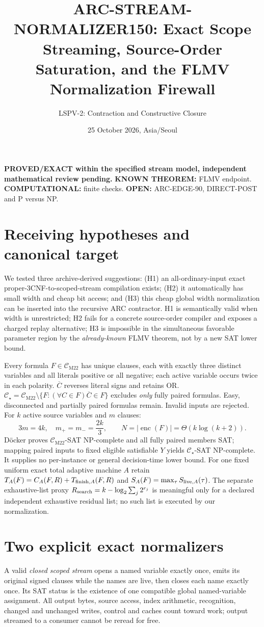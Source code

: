 \documentclass[11pt]{article}
\title{ARC-STREAM-NORMALIZER150: Exact Scope Streaming, Source-Order Saturation, and the FLMV Normalization Firewall}
\author{LSPV-2: Contraction and Constructive Closure}
\date{25 October 2026, Asia/Seoul}
\newcommand{\CM}{\mathcal C_{\mathrm{M22}}}
\newcommand{\CS}{\mathcal C_\star}
\begin{document}
\maketitle
\noindent\textbf{PROVED/EXACT within the specified stream model, independent mathematical review pending.}
\textbf{KNOWN THEOREM:} FLMV endpoint. \textbf{COMPUTATIONAL:} finite checks. \textbf{OPEN:} ARC-EDGE-90, DIRECT-POST and P versus NP.

\section{Receiving hypotheses and canonical target}
We tested three archive-derived suggestions: (H1) an all-ordinary-input exact proper-3CNF-to-scoped-stream compilation exists; (H2) it automatically has small width and cheap bit access; and (H3) this cheap global width normalization can be inserted into the recursive ARC contractor. H1 is semantically valid when width is unrestricted; H2 fails for a concrete source-order compiler and exposes a charged replay alternative; H3 is impossible in the simultaneous favorable parameter region by the \emph{already-known} FLMV theorem, not by a new SAT lower bound.

Every formula $F\in\CM$ has unique clauses, each with exactly three distinct variables and all literals positive or all negative; each active variable occurs twice in each polarity. $\overline C$ reverses literal signs and retains OR. $\CS=\CM\setminus\{F:(\forall C\in F)\overline C\in F\}$ excludes \emph{only} fully paired formulas. Easy, disconnected and partially paired formulas remain. Invalid inputs are rejected. For $k$ active source variables and $m$ clauses:
\[
3m=4k,\quad m_+=m_-=\frac{2k}{3},\qquad N=|\operatorname{enc}(F)|=\Theta(k\log(k+2)).
\]
D\"ocker \cite{docker} proves $\CM$-SAT NP-complete and all fully paired members SAT; mapping paired inputs to fixed eligible satisfiable $Y$ yields $\CS$-SAT NP-complete. It supplies no per-instance or general decision-time lower bound.
For one fixed uniform exact total adaptive machine $A$ retain
$T_A(F)=C_A(F,R)+T_{{\rm finish},A}(F,R)$ and $S_A(F)=\max_\tau S_{{\rm live},A}(\tau)$.
The separate exhaustive-list proxy $R_{\rm search}=k-\log_2\sum_j2^{r_j}$ is meaningful only for a declared independent exhaustive residual list; no such list is executed by our normalization.

\section{Two explicit exact normalizers}
A valid \emph{closed scoped stream} opens a named variable exactly once, emits its original signed clauses while the names are live, then closes each name exactly once. Its SAT status is the existence of one compatible global named-variable assignment. All output bytes, source access, index arithmetic, recognition, changed and unchanged writes, control and caches count toward work; output streamed to a consumer cannot be reread for free.
\end{document}
